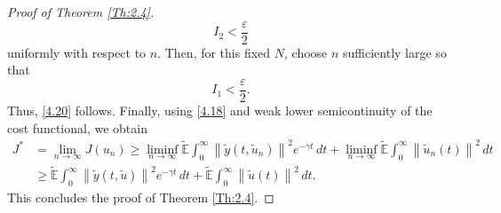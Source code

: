 \documentclass[10pt,a4paper]{amsart}
\begin{document}
\begin{proof}[Proof of Theorem \ref{Th:2.4}]
\[
I_2<\frac{\varepsilon}{2}
\]
uniformly with respect to $n$. Then, for this fixed $N$, choose
$n$ sufficiently large so that
\[
I_1<\frac{\varepsilon}{2}.
\]
Thus, \eqref{4.20} follows. Finally, using \eqref{4.18} and weak lower semicontinuity of the cost
functional, we obtain
\[
\begin{aligned}
J^*
&=
\lim_{n\to\infty}J(u_n) \geq
\liminf_{n\to\infty}
\widetilde{\mathbb{E}}
\int_0^\infty
\left\|
\widetilde{y}(t,\widetilde{u}_n)
\right\|^2
e^{-\gamma t}\,dt
+
\liminf_{n\to\infty}
\widetilde{\mathbb{E}}
\int_0^\infty
\left\|
\widetilde{u}_n(t)
\right\|^2\,dt
\\
&\geq
\widetilde{\mathbb{E}}
\int_0^\infty
\left\|
\widetilde{y}(t,\widetilde{u})
\right\|^2
e^{-\gamma t}\,dt
+
\widetilde{\mathbb{E}}
\int_0^\infty
\left\|
\widetilde{u}(t)
\right\|^2\,dt.
\end{aligned}
\]
This concludes the proof of Theorem \ref{Th:2.4}.
\end{proof}
\end{document}
